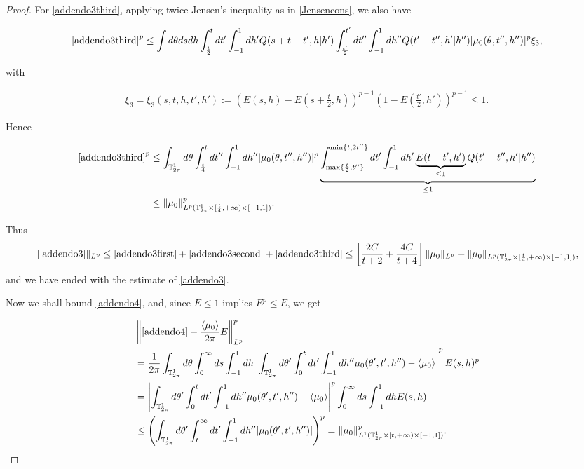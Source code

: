 \documentclass[a4paper,10pt,reqno]{amsart}
\numberwithin{equation}{subsection}
\numberwithin{figure}{subsection}
\begin{document}
\begin{proof}
For \eqref{addendo3third}, applying twice Jensen's inequality as in \eqref{Jensencons}, we also have

{\tiny\begin{align*}
\eqref{addendo3third}^p\leq\int d\theta dsdh\int_{\frac{t}{2}}^tdt'\int_{-1}^1dh'Q(s+t-t',h|h')\int_{\frac{t'}{2}}^{t'}dt''\int_{-1}^1dh''Q(t'-t'',h'|h'')|\mu_0(\theta,t'',h'')|^p\xi_3,
\end{align*}}

with

\begin{align*}
\xi_3=\xi_3(s,t,h,t',h'):=\left(E(s,h)-E\left(s+\frac{t}{2},h\right)\right)^{p-1}\left(1-E\left(\frac{t'}{2},h'\right)\right)^{p-1}\leq1.
\end{align*}

Hence

{\scriptsize\begin{align*}
\eqref{addendo3third}^p&\leq\int_{\mathbb{T}^1_{2\pi}}d\theta\int_{\frac{t}{4}}^tdt''\int_{-1}^1dh''|\mu_0(\theta,t'',h'')|^p\underbrace{\int_{\max\{\frac{t}{2},t''\}}^{\min\{t,2t''\}}dt'\int_{-1}^1dh'\underbrace{E(t-t',h')}_{\leq1}Q(t'-t'',h'|h'')}_{\leq1}
\\
&\leq\|\mu_0\|_{L^p(\mathbb{T}^1_{2\pi}\times[\frac{t}{4},+\infty)\times[-1,1])}^p.
\end{align*}}

Thus 
{\small\[
\|\eqref{addendo3}\|_{L^p}\leq\eqref{addendo3first}+\eqref{addendo3second}+\eqref{addendo3third}\leq\left[\frac{2C}{t+2}+\frac{4C}{t+4}\right]\|\mu_0\|_{L^p}+\|\mu_0\|_{L^p(\mathbb{T}^1_{2\pi}\times[\frac{t}{4},+\infty)\times[-1,1])},
\]}
and we have ended with the estimate of \eqref{addendo3}.

Now we shall bound \eqref{addendo4}, and, since $E\leq1$ implies $E^p\leq E$, we get

{\small\begin{align*}
&\left\|\eqref{addendo4}-\frac{\langle\mu_0\rangle}{2\pi}E\right\|_{L^p}^p
\\
&=\frac{1}{2\pi}\int_{\mathbb{T}^1_{2\pi}}d\theta\int_0^{\infty}ds\int_{-1}^1dh\left|\int_{\mathbb{T}^1_{2\pi}}d\theta'\int_0^tdt'\int_{-1}^1dh''\mu_0(\theta',{t'},h'')-\langle\mu_0\rangle\right|^pE(s,h)^p
\\
&=\left|\int_{\mathbb{T}^1_{2\pi}}d\theta'\int_0^tdt'\int_{-1}^1dh''\mu_0(\theta',{t'},h'')-\langle\mu_0\rangle\right|^p\int_0^{\infty}ds\int_{-1}^1dhE(s,h)
\\
&\leq\left(\int_{\mathbb{T}^1_{2\pi}}d\theta'\int_t^{\infty}dt'\int_{-1}^1dh''|\mu_0(\theta',{t'},h'')|\right)^p=\|\mu_0\|_{L^1(\mathbb{T}^1_{2\pi}\times[t,+\infty)\times[-1,1])}^p.
\end{align*}}


\end{proof}
\end{document}
